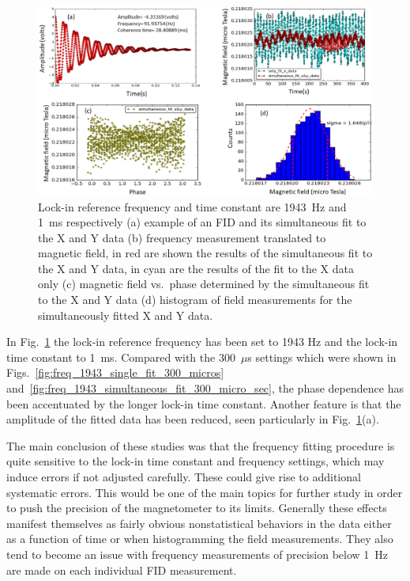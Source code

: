 \begin{figure}%
\centering\includegraphics[width=\linewidth]{figures/freq_1943_simultaneous_fit_1ms.png}
\caption{Lock-in reference frequency and time constant are 1943~Hz and
  1~ms respectively (a) example of an FID and its simultaneous fit to
  the X and Y data (b) frequency measurement translated to magnetic
  field, in red are shown the results of the simultaneous fit to the X
  and Y data, in cyan are the results of the fit to the X data only
  (c) magnetic field vs.~phase determined by the simultaneous fit to
  the X and Y data (d) histogram of field measurements for the
  simultaneously fitted X and Y
  data.\label{fig:freq_1943_simultaneous_fit_1ms}}
\end{figure}

In Fig.~\ref{fig:freq_1943_simultaneous_fit_1ms} the lock-in reference
frequency has been set to 1943 Hz and the lock-in time constant to
1~ms.  Compared with the 300~$\mu$s settings which were shown in
Figs.~\ref{fig:freq_1943_single_fit_300_micros}
and~\ref{fig:freq_1943_simultaneous_fit_300_micro_sec}, the phase
dependence has been accentuated by the longer lock-in time constant.
Another feature is that the amplitude of the fitted data has been
reduced, seen particularly in
Fig.~\ref{fig:freq_1943_simultaneous_fit_1ms}(a).

The main conclusion of these studies was that the frequency fitting
procedure is quite sensitive to the lock-in time constant and
frequency settings, which may induce errors if not adjusted carefully.
These could give rise to additional systematic errors.  This would be
one of the main topics for further study in order to push the
precision of the magnetometer to its limits.  Generally these effects
manifest themselves as fairly obvious nonstatistical behaviors in the
data either as a function of time or when histogramming the field
measurements.  They also tend to become an issue with frequency
measurements of precision below 1~Hz are made on each individual FID
measurement.

